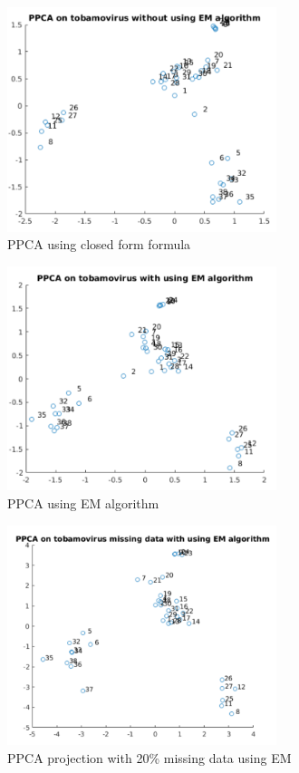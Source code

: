 \begin{figure}
	\centering
  	\includegraphics[width=0.7\textwidth]{./images/PPCA.png}
  	\caption{PPCA using closed form formula}
  	\label{T2}
\end{figure}

\begin{figure}
	\centering
  	\includegraphics[width=0.7\textwidth]{./images/PPCAEM.png}
  	\caption{PPCA using EM algorithm}
  	\label{T3}
\end{figure}

\begin{figure}
	\centering
  	\includegraphics[width=0.7\textwidth]{./images/PPCAEMMiss.png}
  	\caption{PPCA projection with 20\% missing data using EM}
  	\label{T4}
\end{figure}


